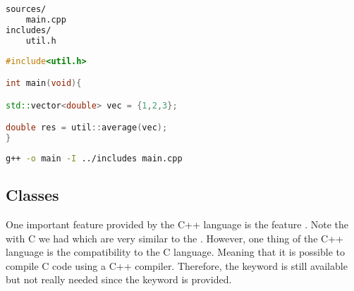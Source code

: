 \begin{minipage}{\linewidth}

\begin{minipage}{0.45\linewidth}
\begin{lstlisting}[language=bash,caption={Folder structure for a project with header files.\label{code:folder:header}}]
sources/
    main.cpp
includes/
    util.h
\end{lstlisting}
\end{minipage}
\hfill
\begin{minipage}{0.45\linewidth}
\begin{lstlisting}[language=c++,caption={Example for the main.cpp file using a header file.\label{code:main:header}}]
#include<util.h>

int main(void){

std::vector<double> vec = {1,2,3};

double res = util::average(vec);
}
\end{lstlisting}
\end{minipage}


\begin{minipage}{\linewidth}
\begin{lstlisting}[language=bash,caption={Compilation of the main.cpp file using a header file.\label{code:compile:header}}]
g++ -o main -I ../includes main.cpp
\end{lstlisting}
\end{minipage}

\end{minipage}


\subsection{Classes}
One important feature provided by the C++ language is the feature . Note the with C we had  which are very similar to the . However, one thing of the C++ language is the compatibility to the C language. Meaning that it is possible to compile C code using a C++ compiler. Therefore, the  keyword is still available but not really needed since the keyword  is provided. \\

